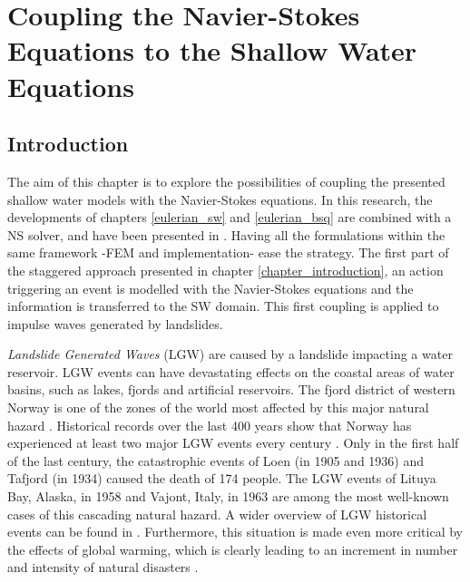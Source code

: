 
\chapter{Coupling the Navier-Stokes Equations to the Shallow Water Equations}
\label{coupling}


\section{Introduction}



The aim of this chapter is to explore the possibilities of coupling the presented shallow water models with the Navier-Stokes equations.
In this research, the developments of chapters \ref{eulerian_sw} and \ref{eulerian_bsq} are combined with a NS solver, and have been presented in \cite{maso2022b}. Having all the formulations within the same framework -FEM and implementation- ease the strategy. The first part of the staggered approach presented in chapter \ref{chapter_introduction}, an action triggering an event is modelled with the Navier-Stokes equations and the information is transferred to the SW domain. This first coupling is applied to impulse waves generated by landslides.

\emph{Landslide Generated Waves} (LGW) are caused by a landslide impacting a water reservoir. LGW events can have devastating effects on the coastal areas of water basins, such as lakes, fjords and artificial reservoirs. 
The fjord district of western Norway is one of the zones of the world most affected by this major natural hazard \cite{hermanns2014catalogue}. Historical records over the last 400 years show that Norway has experienced at least two major LGW events every century \cite{Harbitz2014}. Only in the first half of the last century, the catastrophic events of Loen (in 1905 and 1936) \cite{grimstad1991loen} and Tafjord (in 1934) \cite{higman20182015} caused the death of 174 people. The LGW events of Lituya Bay, Alaska, in 1958 \cite{Miller1960} and Vajont, Italy, in 1963 \cite{Semenza1965} are among the most well-known cases of this cascading natural hazard.
A wider overview of LGW historical events can be found in \cite{roberts2014preliminary}.
Furthermore, this situation is made even more critical by the effects of global warming, which is clearly leading to an increment in number and intensity of natural disasters \cite{Haque2019}.

